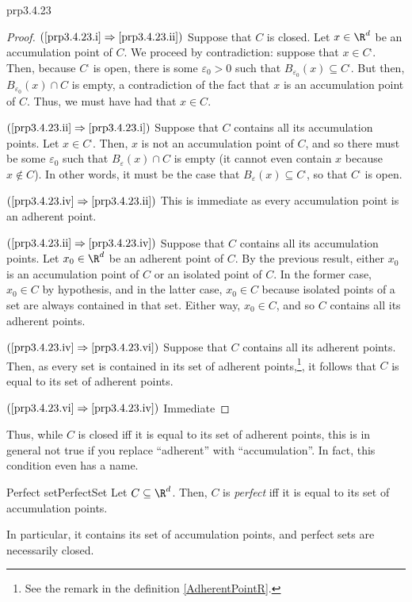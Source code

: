 \begin{thm}{}{prp3.4.23}
\begin{proof}
\blankline
\noindent
$(\cref{prp3.4.23.i}\Rightarrow \cref{prp3.4.23.ii})$ Suppose that $C$ is closed.  Let $x\in \R ^d$ be an accumulation point of $C$.  We proceed by contradiction:  suppose that $x\in C^{\comp}$.  Then, because $C^{\comp}$ is open, there is some $\varepsilon _0>0$ such that $B_{\varepsilon _0}(x)\subseteq C^{\comp}$.  But then, $B_{\varepsilon _0}(x)\cap C$ is empty, a contradiction of the fact that $x$ is an accumulation point of $C$.  Thus, we must have had that $x\in C$.

\blankline
\noindent
$(\cref{prp3.4.23.ii}\Rightarrow \cref{prp3.4.23.i})$ Suppose that $C$ contains all its accumulation points.  Let $x\in C^{\comp}$.  Then, $x$ is not an accumulation point of $C$, and so there must be some $\varepsilon _0$ such that $B_{\varepsilon}(x)\cap C$ is empty (it cannot even contain $x$ because $x\notin C$).  In other words, it must be the case that $B_{\varepsilon}(x)\subseteq C^{\comp}$, so that $C^{\comp}$ is open.

\blankline
\noindent
$(\cref{prp3.4.23.iv}\Rightarrow \cref{prp3.4.23.ii})$ This is immediate as every accumulation point is an adherent point.

\blankline
\noindent
$(\cref{prp3.4.23.ii}\Rightarrow \cref{prp3.4.23.iv})$ Suppose that $C$ contains all its accumulation points.  Let $x_0\in \R ^d$ be an adherent point of $C$.  By the previous result, either $x_0$ is an accumulation point of $C$ or an isolated point of $C$.  In the former case, $x_0\in C$ by hypothesis, and in the latter case, $x_0\in C$ because isolated points of a set are always contained in that set.  Either way, $x_0\in C$, and so $C$ contains all its adherent points.

\blankline
\noindent
$(\cref{prp3.4.23.iv}\Rightarrow \cref{prp3.4.23.vi})$ Suppose that $C$ contains all its adherent points.  Then, as every set is contained in its set of adherent points,\footnote{See the remark in the definition \cref{AdherentPointR}.}, it follows that $C$ is equal to its set of adherent points.

\blankline
\noindent
$(\cref{prp3.4.23.vi}\Rightarrow \cref{prp3.4.23.iv})$ Immediate
\end{proof}
\end{thm}
Thus, while $C$ is closed iff it is equal to its set of adherent points, this is in general not true if you replace ``adherent'' with ``accumulation''.  In fact, this condition even has a name.
\begin{dfn}{Perfect set}{PerfectSet}
Let $C\subseteq \R ^d$.  Then, $C$ is \emph{perfect} iff it is equal to its set of accumulation points.
\begin{rmk}
In particular, it contains its set of accumulation points, and perfect sets are necessarily closed.
\end{rmk}
\end{dfn}
